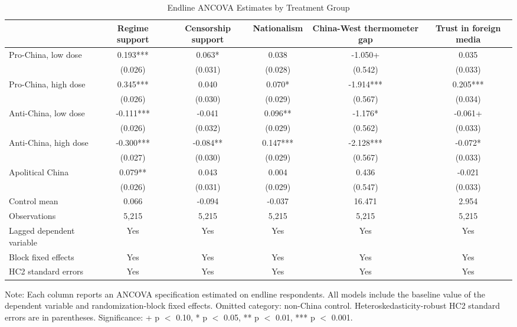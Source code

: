 \begin{table}[H]
\centering
\caption{Endline ANCOVA Estimates by Treatment Group}
\label{tab:main_ancova_t1}
\footnotesize
\begin{threeparttable}
\begin{tabular}{lccccc}
\toprule
 & Regime support & Censorship support & Nationalism & China-West thermometer gap & Trust in foreign media \\
\midrule
Pro-China, low dose & 0.193*** & 0.063* & 0.038 & -1.050+ & 0.035 \\
 & (0.026) & (0.031) & (0.028) & (0.542) & (0.033) \\
\addlinespace
Pro-China, high dose & 0.345*** & 0.040 & 0.070* & -1.914*** & 0.205*** \\
 & (0.026) & (0.030) & (0.029) & (0.567) & (0.034) \\
\addlinespace
Anti-China, low dose & -0.111*** & -0.041 & 0.096** & -1.176* & -0.061+ \\
 & (0.026) & (0.032) & (0.029) & (0.562) & (0.033) \\
\addlinespace
Anti-China, high dose & -0.300*** & -0.084** & 0.147*** & -2.128*** & -0.072* \\
 & (0.027) & (0.030) & (0.029) & (0.567) & (0.033) \\
\addlinespace
Apolitical China & 0.079** & 0.043 & 0.004 & 0.436 & -0.021 \\
 & (0.026) & (0.031) & (0.029) & (0.547) & (0.033) \\
\addlinespace
\midrule
Control mean & 0.066 & -0.094 & -0.037 & 16.471 & 2.954 \\
Observations & 5,215 & 5,215 & 5,215 & 5,215 & 5,215 \\
Lagged dependent variable & Yes & Yes & Yes & Yes & Yes \\
Block fixed effects & Yes & Yes & Yes & Yes & Yes \\
HC2 standard errors & Yes & Yes & Yes & Yes & Yes \\
\bottomrule
\end{tabular}
\begin{tablenotes}[flushleft]
\footnotesize
\item Note: Each column reports an ANCOVA specification estimated on endline respondents. All models include the baseline value of the dependent variable and randomization-block fixed effects. Omitted category: non-China control. Heteroskedasticity-robust HC2 standard errors are in parentheses. Significance: + p $<$ 0.10, * p $<$ 0.05, ** p $<$ 0.01, *** p $<$ 0.001.
\end{tablenotes}
\end{threeparttable}
\end{table}
